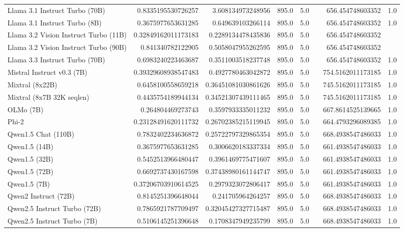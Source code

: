 \begin{table}[htp]
{\begin{tabular}{lrrrrrrr}
Llama 3.1 Instruct Turbo (70B) & 0.8335195530726257 & 3.608134973248956 & 895.0 & 5.0 &  & 656.454748603352 & 1.0 \\
Llama 3.1 Instruct Turbo (8B) & 0.3675977653631285 & 0.649639103266114 & 895.0 & 5.0 &  & 656.454748603352 & 1.0 \\
Llama 3.2 Vision Instruct Turbo (11B) & 0.32849162011173183 & 0.2289134478435836 & 895.0 & 5.0 &  & 656.454748603352 &  \\
Llama 3.2 Vision Instruct Turbo (90B) & 0.841340782122905 & 0.5058047955262595 & 895.0 & 5.0 &  & 656.454748603352 &  \\
Llama 3.3 Instruct Turbo (70B) & 0.6983240223463687 & 0.3511003518237748 & 895.0 & 5.0 &  & 656.454748603352 & 1.0 \\
Mistral Instruct v0.3 (7B) & 0.39329608938547483 & 0.4927780463042872 & 895.0 & 5.0 &  & 754.5162011173185 & 1.0 \\
Mixtral (8x22B) & 0.6458100558659218 & 0.36451081030861626 & 895.0 & 5.0 &  & 745.5162011173185 & 1.0 \\
Mixtral (8x7B 32K seqlen) & 0.4435754189944134 & 0.34521307439111465 & 895.0 & 5.0 &  & 745.5162011173185 & 1.0 \\
OLMo (7B) & 0.264804469273743 & 0.3597933335011232 & 895.0 & 5.0 &  & 667.8614525139665 & 1.0 \\
Phi-2 & 0.23128491620111732 & 0.26702385215119945 & 895.0 & 5.0 &  & 664.4793296089385 & 1.0 \\
Qwen1.5 Chat (110B) & 0.7832402234636872 & 0.25722797329865354 & 895.0 & 5.0 &  & 668.4938547486033 & 1.0 \\
Qwen1.5 (14B) & 0.3675977653631285 & 0.3006620183337334 & 895.0 & 5.0 &  & 661.4938547486033 & 1.0 \\
Qwen1.5 (32B) & 0.5452513966480447 & 0.3961469775471607 & 895.0 & 5.0 &  & 661.4938547486033 & 1.0 \\
Qwen1.5 (72B) & 0.6692737430167598 & 0.37438980161144747 & 895.0 & 5.0 &  & 661.4938547486033 & 1.0 \\
Qwen1.5 (7B) & 0.37206703910614525 & 0.2979323072806417 & 895.0 & 5.0 &  & 661.4938547486033 & 1.0 \\
Qwen2 Instruct (72B) & 0.8145251396648044 & 0.241705964264257 & 895.0 & 5.0 &  & 668.4938547486033 & 1.0 \\
Qwen2.5 Instruct Turbo (72B) & 0.7865921787709497 & 0.32045427327715487 & 895.0 & 5.0 &  & 668.4938547486033 & 1.0 \\
Qwen2.5 Instruct Turbo (7B) & 0.5106145251396648 & 0.1708347949235799 & 895.0 & 5.0 &  & 668.4938547486033 & 1.0 \\

\end{tabular}}
\end{table}
